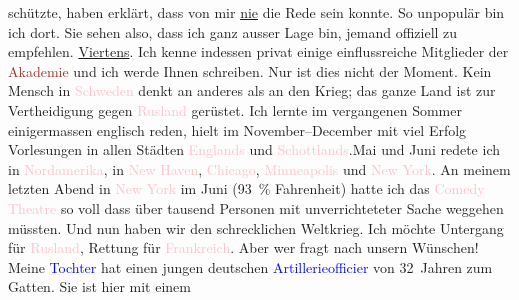                     schützte, haben erklärt, dass von mir \uline{nie} die
                    Rede sein konnte. So unpopulär bin ich dort. Sie sehen also, dass ich ganz
                    ausser Lage bin, jemand offiziell zu empfehlen.\pend
           \pstart
           \uline{Viertens}. Ich kenne indessen privat einige
                    einflussreiche Mitglieder der \textcolor{brown}{Akademie}{} und ich werde Ihnen schreiben.\pend
           \pstart
           Nur ist dies nicht der Moment. Kein Mensch in \textcolor{pink}{Schweden}{}\ledrightnote{\textcolor{pink}{Schweden}} denkt an anderes als an den Krieg; das ganze Land ist zur
                    Vertheidigung gegen \textcolor{pink}{Rusland}{}\ledrightnote{\textcolor{pink}{Russland}} gerüstet.\pend
           \pstart
           {\pb}Ich lernte im vergangenen
                    Sommer einigermassen englisch reden, hielt im
                        November–December mit viel Erfolg Vorlesungen in
                    allen Städten \textcolor{pink}{Englands}{}\ledrightnote{\textcolor{pink}{England}} und \textcolor{pink}{Schottlands}{}\ledrightnote{\textcolor{pink}{Schottland}}.\hspace*{2em}Mai und Juni redete ich in \textcolor{pink}{Nordamerika}{}\ledrightnote{\textcolor{pink}{Amerika}}, in \textcolor{pink}{New Haven}{}\ledrightnote{\textcolor{pink}{New Haven}}, \textcolor{pink}{Chicago}{}\ledrightnote{\textcolor{pink}{Chicago}}, \textcolor{pink}{Minneapolis}{}\ledrightnote{\textcolor{pink}{Minneapolis}} und \textcolor{pink}{New York}{}\ledrightnote{\textcolor{pink}{New York City}}. An meinem
                    letzten Abend in \textcolor{pink}{New York}{}\ledrightnote{\textcolor{pink}{New York City}} im
                        Juni (93 {\%} Fahrenheit) hatte ich das
                        \textcolor{pink}{Comedy Theatre}{}\ledrightnote{\textcolor{pink}{Comedy Theatre}} so voll dass über tausend
                    Personen mit unverrichteteter Sache weggehen müssten.\pend
           \pstart
           Und nun haben wir den schrecklichen Weltkrieg. Ich möchte Untergang für \textcolor{pink}{Rusland}{}\ledrightnote{\textcolor{pink}{Russland}}, Rettung für \textcolor{pink}{Frankreich}{}\ledrightnote{\textcolor{pink}{Frankreich}}. Aber wer fragt nach unsern Wünschen! Meine \textcolor{blue}{Tochter}{} hat einen jungen
                    deutschen \textcolor{blue}{Artillerieofficier}{} von 32 Jahren zum Gatten. Sie ist hier mit einem
